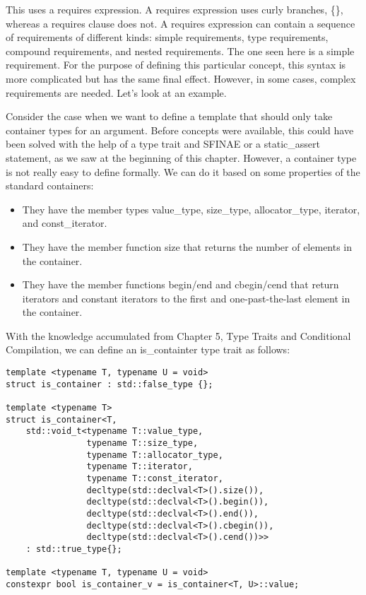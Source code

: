 This uses a requires expression. A requires expression uses curly branches, \{\}, whereas a requires clause does not. A requires expression can contain a sequence of requirements of different kinds: simple requirements, type requirements, compound requirements, and nested requirements. The one seen here is a simple requirement. For the purpose of defining this particular concept, this syntax is more complicated but has the same final effect. However, in some cases, complex requirements are needed. Let’s look at an example.

Consider the case when we want to define a template that should only take container types for an argument. Before concepts were available, this could have been solved with the help of a type trait and SFINAE or a static\_assert statement, as we saw at the beginning of this chapter. However, a container type is not really easy to define formally. We can do it based on some properties of the standard containers:

\begin{itemize}
\item
They have the member types value\_type, size\_type, allocator\_type, iterator, and const\_iterator.

\item
They have the member function size that returns the number of elements in the container.

\item
They have the member functions begin/end and cbegin/cend that return iterators and constant iterators to the first and one-past-the-last element in the container.
\end{itemize}

With the knowledge accumulated from Chapter 5, Type Traits and Conditional Compilation, we can define an is\_containter type trait as follows:

\begin{lstlisting}[style=styleCXX]
template <typename T, typename U = void>
struct is_container : std::false_type {};

template <typename T>
struct is_container<T,
	std::void_t<typename T::value_type,
				typename T::size_type,
				typename T::allocator_type,
				typename T::iterator,
				typename T::const_iterator,
				decltype(std::declval<T>().size()),
				decltype(std::declval<T>().begin()),
				decltype(std::declval<T>().end()),
				decltype(std::declval<T>().cbegin()),
				decltype(std::declval<T>().cend())>>
	: std::true_type{};

template <typename T, typename U = void>
constexpr bool is_container_v = is_container<T, U>::value;
\end{lstlisting}


